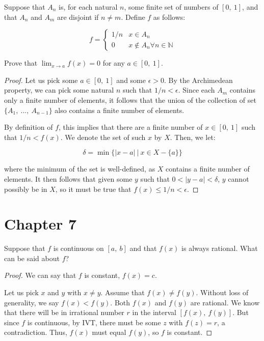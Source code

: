 \documentclass[10pt, oneside]{amsart}
\newenvironment{problem}[2][Problem]{\begin{trivlist}
\item[\hskip \labelsep {\bfseries #1}\hskip \labelsep {\bfseries #2.}]}{\end{trivlist}}
\begin{document}
    \begin{problem}{5.24}

      Suppose that $A_n$ is, for each natural $n$, some finite set of numbers of $[0, \ 1]$, and
      that $A_n$ and $A_m$ are disjoint if $n \neq m$. Define $f$ as follows:

      $$f = \begin{cases}
        1/n & x \in A_n \\
        0 & x \notin A_n \forall n \in \mathbb{N}
      \end{cases}
      $$

      Prove that $\lim_{x \to a} f(x) = 0$ for any $a \in [0, \ 1]$.

    \end{problem}

    \begin{proof}

      Let us pick some $a \in [0, \ 1]$ and some $\epsilon > 0$. By the Archimedean property, we can pick some natural $n$ such that
      $1/n < \epsilon$. Since each $A_m$ contains only a finite number of elements, it follows that the union of the collection
      of set $\{A_{1}, \ ..., \ A_{n - 1}\}$ also contains a finite number of elements.
      \newline

      By definition of $f$, this implies that there are a finite
      number of $x \in [0, \ 1]$ such that $1/n < f(x)$. We denote the set of such $x$ by $X$. Then, we let:

      $$\delta = \min\{|x - a| \ | \ x \in X - \{a\}\}$$

      where the minimum of the set is well-defined, as $X$ contains a finite number of elements. It then follows that
      given some $y$ such that $0 < |y - a| < \delta$, $y$ cannot possibly be in $X$, so it must be true that $f(x) \leq 1/n < \epsilon$.

    \end{proof}


    \section{Chapter 7}

    \begin{problem}{7.5}
      Suppose that $f$ is continuous on $[a, \ b]$ and that $f(x)$ is always rational. What can be said about $f$?
    \end{problem}

    \begin{proof}
      We can say that $f$ is constant, $f(x) = c$.
      \newline

      Let us pick $x$ and $y$ with $x \neq y$. Assume that $f(x) \neq f(y)$. Without loss of generality, we say $f(x) < f(y)$. Both
      $f(x)$ and $f(y)$ are rational. We know that there will be in irrational number $r$ in the interval $[f(x), \ f(y)]$. But since $f$ is continuous, by
      IVT, there must be some $z$ with $f(z) = r$, a contradiction. Thus, $f(x)$ must equal $f(y)$, so $f$ is constant.
      \end{proof}
\end{document}
